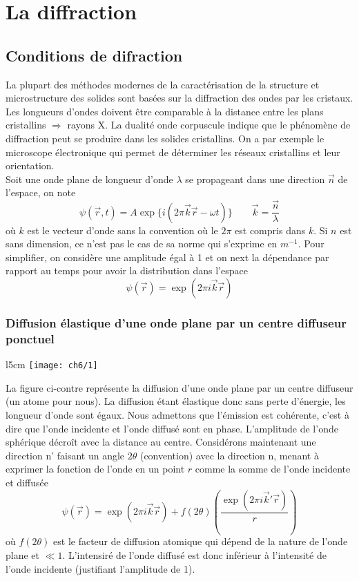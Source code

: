 
\chapter{La diffraction}
\section{Conditions de difraction}
	La plupart des méthodes modernes de la caractérisation de la structure et microstructure des solides sont basées sur la diffraction des ondes par les cristaux. Les longueurs d'ondes doivent être comparable à la distance entre les plans cristallins $\Rightarrow$ rayons X. La dualité onde corpuscule indique que le phénomène de diffraction peut se produire dans les solides cristallins. On a par exemple le microscope électronique qui permet de déterminer les réseaux cristallins et leur orientation. \\
	Soit une onde plane de longueur d'onde $\lambda$ se propageant dans une direction $\vec{n}$ de l'espace, on note
	\begin{equation}
		\psi (\vec{r},t)= A \exp \{i(2\pi \vec{k}\vec{r}-\omega t)\}\qquad \vec{k} = \frac{\vec{n}}{\lambda}
	\end{equation}
	où $k$ est le vecteur d'onde sans la convention où le $2\pi$ est compris dans $k$. Si $n$ est sans dimension, ce n'est pas le cas de sa norme qui s'exprime en $m^{-1}$. Pour simplifier, on considère une amplitude égal à 1 et on next la dépendance par rapport au temps pour avoir la distribution dans l'espace
	\begin{equation}
		\psi (\vec{r}) = \exp (2\pi i \vec{k}\vec{r})
	\end{equation}
	
	\subsection{Diffusion élastique d'une onde plane par un centre diffuseur ponctuel}
	\begin{wrapfigure}[8]{l}{5cm}
	\vspace{-5mm}
	\texttt{[image: ch6/1]}
	\end{wrapfigure}
	La figure ci-contre représente la diffusion d'une onde plane par un centre diffuseur (un atome pour nous). La diffusion étant élastique donc sans perte d'énergie, les longueur d'onde sont égaux. Nous admettons que l'émission est cohérente, c'est à dire que l'onde incidente et l'onde diffusé sont en phase. L'amplitude de l'onde sphérique décroît avec la distance au centre. Considérons maintenant une direction n' faisant un angle $2\theta$ (convention) avec la direction n, menant à exprimer la fonction de l'onde en un point $r$ comme la somme de l'onde incidente et diffusée
	\begin{equation}
		\psi (\vec{r}) = \exp (2\pi i \vec{k}\vec{r}) + f(2\theta )\left(\frac{\exp (2\pi i \vec{k}'\vec{r})}{r} \right)
	\end{equation}
	où $f(2\theta )$ est le facteur de diffusion atomique qui dépend de la nature de l'onde plane et $\ll 1$. L'intensiré de l'onde diffusé est donc inférieur à l'intensité de l'onde incidente (justifiant l'amplitude de 1).   \newpage
	
